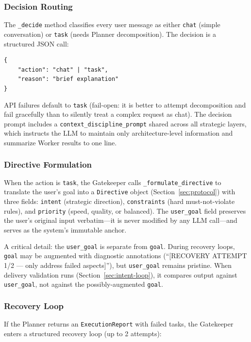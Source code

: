 \documentclass[11pt,a4paper]{article}
\begin{document}
\subsubsection*{Decision Routing}

The \texttt{\_decide} method classifies every user message as either
\texttt{chat} (simple conversation) or \texttt{task} (needs Planner
decomposition). The decision is a structured JSON call:

\begin{lstlisting}
{
    "action": "chat" | "task",
    "reason": "brief explanation"
}
\end{lstlisting}

API failures default to \texttt{task} (fail-open: it is better to attempt
decomposition and fail gracefully than to silently treat a complex request as
chat). The decision prompt includes a \texttt{context\_discipline\_prompt}
shared across all strategic layers, which instructs the LLM to maintain only
architecture-level information and summarize Worker results to one line.

\subsubsection*{Directive Formulation}

When the action is \texttt{task}, the Gatekeeper calls
\texttt{\_formulate\_directive} to translate the user's goal into a
\texttt{Directive} object (Section~\ref{sec:protocol}) with three fields:
\texttt{intent} (strategic direction), \texttt{constraints} (hard must-not-violate
rules), and \texttt{priority} (speed, quality, or balanced). The
\texttt{user\_goal} field preserves the user's original input verbatim---it is
never modified by any LLM call---and serves as the system's immutable anchor.

A critical detail: the \texttt{user\_goal} is separate from \texttt{goal}.
During recovery loops, \texttt{goal} may be augmented with diagnostic
annotations (``[RECOVERY ATTEMPT 1/2 --- only address failed aspects]''),
but \texttt{user\_goal} remains pristine. When delivery validation runs
(Section~\ref{sec:intent-loop}), it compares output against
\texttt{user\_goal}, not against the possibly-augmented \texttt{goal}.

\subsubsection*{Recovery Loop}

If the Planner returns an \texttt{ExecutionReport} with failed tasks, the
Gatekeeper enters a structured recovery loop (up to 2 attempts):
\end{document}
